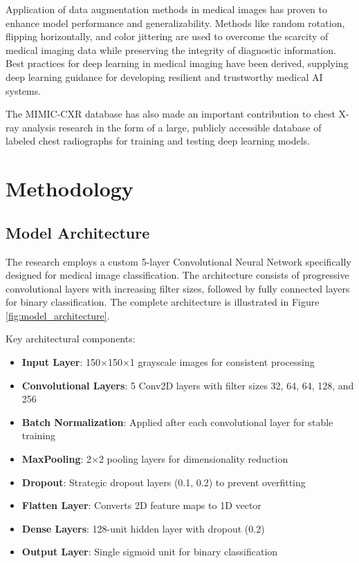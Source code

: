 \documentclass[conference]{IEEEtran}
\begin{document}
Application of data augmentation methods in medical images has proven to enhance model performance and generalizability. Methods like random rotation, flipping horizontally, and color jittering are used to overcome the scarcity of medical imaging data while preserving the integrity of diagnostic information. Best practices for deep learning in medical imaging have been derived, supplying deep learning guidance for developing resilient and trustworthy medical AI systems.

The MIMIC-CXR database has also made an important contribution to chest X-ray analysis research in the form of a large, publicly accessible database of labeled chest radiographs for training and testing deep learning models. 

\section{Methodology}

\subsection{Model Architecture}
The research employs a custom 5-layer Convolutional Neural Network specifically designed for medical image classification. The architecture consists of progressive convolutional layers with increasing filter sizes, followed by fully connected layers for binary classification. The complete architecture is illustrated in Figure \ref{fig:model_architecture}.

Key architectural components:
\begin{itemize}
    \item \textbf{Input Layer}: 150×150×1 grayscale images for consistent processing
    \item \textbf{Convolutional Layers}: 5 Conv2D layers with filter sizes 32, 64, 64, 128, and 256
    \item \textbf{Batch Normalization}: Applied after each convolutional layer for stable training
    \item \textbf{MaxPooling}: 2×2 pooling layers for dimensionality reduction
    \item \textbf{Dropout}: Strategic dropout layers (0.1, 0.2) to prevent overfitting
    \item \textbf{Flatten Layer}: Converts 2D feature maps to 1D vector
    \item \textbf{Dense Layers}: 128-unit hidden layer with dropout (0.2)
    \item \textbf{Output Layer}: Single sigmoid unit for binary classification
\end{itemize}
\end{document}
